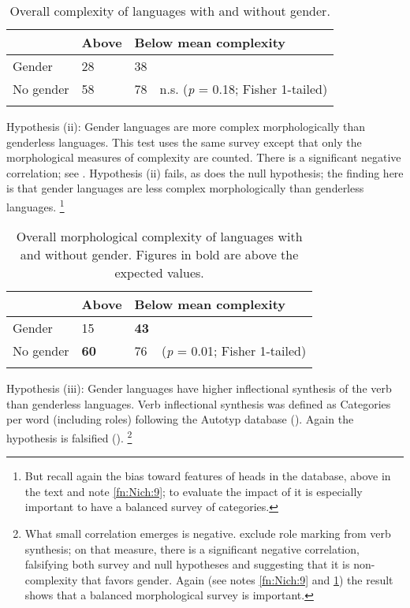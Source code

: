 \documentclass[output=collectionpaper]{langsci/langscibook}
\begin{document}
\begin{table}
\caption{Overall complexity of languages with and without gender.}
\label{extab:Nich:9}
\begin{tabularx}{\textwidth}{p{2.7cm}Xp{1.3cm}l}
\lsptoprule
		 &	Above  &		\multicolumn{2}{l}{Below mean complexity} \\
			 \midrule
	Gender &		28		 &38 \\
	No gender	 & 58	 &	78	& n.s. (\textit{p} = 0.18; Fisher 1-tailed) \\
\lspbottomrule\end{tabularx}
\end{table}

Hypothesis (ii): Gender languages are more complex morphologically than genderless languages.  This test uses the same survey except that only the morphological measures of complexity are counted. There is a significant negative correlation; see . Hypothesis (ii) fails, as does the null hypothesis; the finding here is that gender languages are less complex morphologically than genderless languages.%
\footnote{%
\label{fn:Nich:10}%
But recall again the bias toward features of heads in the database, above in the text and note \ref{fn:Nich:9}; to evaluate the impact of  it is especially important to have a balanced survey of categories.}%

\begin{table}
\caption{Overall morphological complexity of languages with and without gender. Figures in bold are above the expected values.}
\label{extab:Nich:10}

\begin{tabularx}{\textwidth}{p{2.7cm}Xp{1.3cm}l}
\lsptoprule
		 &	Above  &		\multicolumn{2}{l}{Below mean complexity} \\
			 \midrule
	Gender	 &	15	 &	\textbf{43} \\
	No gender	 &\textbf{60}		 &76		 & (\textit{p} = 0.01; Fisher 1-tailed)
\\\lspbottomrule\end{tabularx}
\end{table}
 
 \largerpage
Hypothesis (iii): Gender languages have higher inflectional synthesis of the verb than genderless languages. Verb inflectional synthesis was defined as Categories per word (including roles) following the Autotyp database (\citealt{Bickel2017}). Again the hypothesis is falsified ().%
\footnote{%
What small correlation emerges is negative. \citet{Bickel2013} exclude role marking from verb synthesis; on that measure, there is a significant negative correlation, falsifying both survey and null hypotheses and suggesting that it is non-complexity that favors gender. Again (see notes \ref{fn:Nich:9} and \ref{fn:Nich:10}) the result shows that a balanced morphological survey is important.
}%
\clearpage
\end{document}
